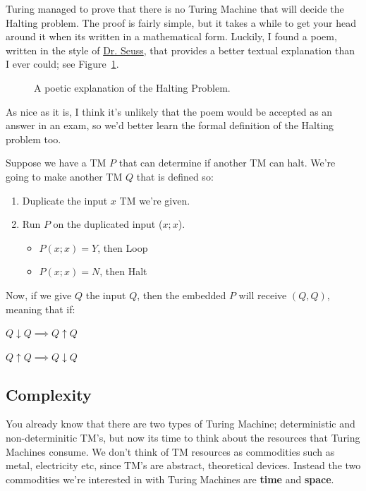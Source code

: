 Turing managed to prove that there is no Turing Machine that will decide the
Halting problem. The proof is fairly simple, but it takes a while to get your
head around it when its written in a mathematical form. Luckily, I found a poem,
written in the style of \href{https://en.wikipedia.org/wiki/Dr._Seuss}{Dr.
Seuss}, that provides a better textual explanation than I ever could; see
Figure~\ref{fig:halting-poem}.

\begin{figure}[h]
\begin{minipage}{\textwidth}
  \begin{mymulticols}
  
  \end{mymulticols}
  \restoregeometry
\end{minipage}
\caption{A poetic explanation of the Halting Problem.}
\label{fig:halting-poem}
\end{figure}

As nice as it is, I think it's unlikely that the poem would be accepted as an
answer in an exam, so we'd better learn the formal definition of the Halting
problem too.

Suppose we have a TM $P$ that can determine if another TM can halt. We're going
to make another TM $Q$ that is defined so:

\begin{enumerate}
  \item Duplicate the input $x$ TM we're given.
  \item Run $P$ on the duplicated input ($x;x$).
  \begin{itemize}
    \item[] $P(x;x) = Y$, then Loop 
    \item[] $P(x;x) = N$, then Halt
  \end{itemize}
\end{enumerate}

Now, if we give $Q$ the input $Q$, then the embedded $P$ will receive $(Q,Q)$,
meaning that if:

\begin{description}
  \item $Q \downarrow Q \implies Q \uparrow Q$
  \item $Q \uparrow Q \implies Q \downarrow Q$
\end{description}


\subsection{Complexity}

You already know that there are two types of Turing Machine; deterministic and
non-determinitic TM's, but now its time to think about the resources that Turing
Machines consume. We don't think of TM resources as commodities such as metal,
electricity etc, since TM's are abstract, theoretical devices. Instead the two
commodities we're interested in with Turing Machines are \textbf{time} and
\textbf{space}.

